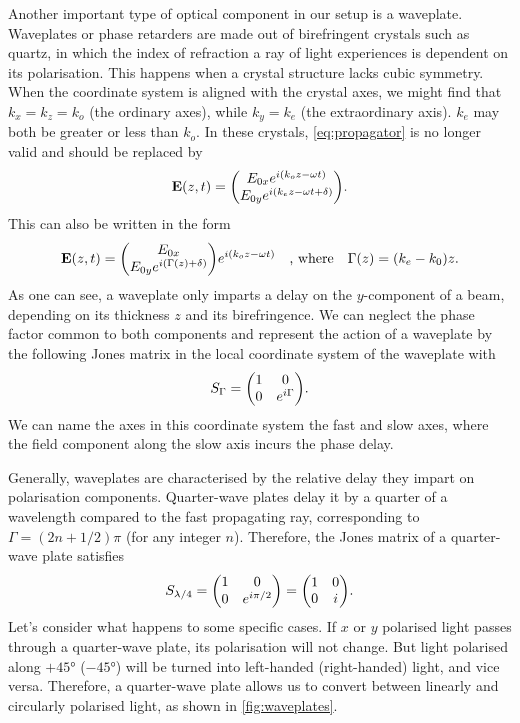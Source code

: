 Another important type of optical component in our setup is a waveplate. Waveplates or phase retarders are made out of birefringent crystals such as quartz, in which the index of refraction a ray of light experiences is dependent on its polarisation. This happens when a crystal structure lacks cubic symmetry. When the coordinate system is aligned with the crystal axes, we might find that $ k_x = k_z = k_o $ (the ordinary axes), while $ k_y = k_e $ (the extraordinary axis). $ k_e $ may both be greater or less than $ k_o $. In these crystals, \autoref{eq:propagator} is no longer valid and should be replaced by
\begin{equation}
	\vb{E}(z, t) = \mqty(\Eox e^{i(k_o z-\omega t)} \\ \Eoy e^{i(k_e z-\omega t + \delta)} ).
\end{equation}
This can also be written in the form
\begin{equation}
	\vb{E}(z, t) = \mqty(\Eox  \\ \Eoy e^{i(\Gamma(z) + \delta)} ) e^{i(k_o z-\omega t)}
	\qq{, where}
	\Gamma(z) = (k_e-k_0) z.
\end{equation}
As one can see, a waveplate only imparts a delay on the $ y $-component of a beam, depending on its thickness $ z $ and its birefringence. We can neglect the phase factor common to both components and represent the action of a waveplate by the following Jones matrix in the local coordinate system of the waveplate with
\begin{equation}
	S_\Gamma = \mqty(1 & 0 \\ 0 & e^{i\Gamma}).
\end{equation}
We can name the axes in this coordinate system the fast and slow axes, where the field component along the slow axis incurs the phase delay.

Generally, waveplates are characterised by the relative delay they impart on polarisation components. Quarter-wave plates delay it by a quarter of a wavelength compared to the fast propagating ray, corresponding to $ \Gamma = (2n + 1/2)\pi $ (for any integer $ n $). Therefore, the Jones matrix of a quarter-wave plate satisfies 
\begin{equation}
	S_\qwp = \mqty(1 & 0 \\ 0 & e^{i\pi/2}) = \mqty(1 & 0 \\ 0 & i).
\end{equation}
Let's consider what happens to some specific cases. If $ x $ or $ y $ polarised light passes through a quarter-wave plate, its polarisation will not change. But light polarised along $ +\ang{45} $ ($ -\ang{45} $) will be turned into left-handed (right-handed) light, and vice versa. Therefore, a quarter-wave plate allows us to convert between linearly and circularly polarised light, as shown in \autoref{fig:waveplates}.

